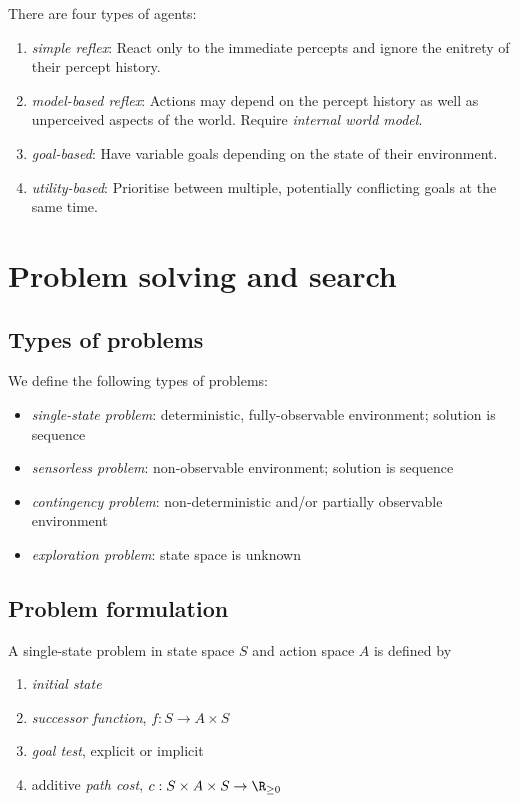 \documentclass{article}
\begin{document}
\begin{definition}[R\&N p. 47]
    There are four types of agents:
    \begin{enumerate}
        \item \emph{simple reflex}: React only to the immediate percepts and ignore
        the enitrety of their percept history.
        \item \emph{model-based reflex}: Actions may depend on the percept history
        as well as unperceived aspects of the world. Require \emph{internal world
        model}.
        \item \emph{goal-based}: Have variable goals depending on the state of their
        environment.
        \item \emph{utility-based}: Prioritise between multiple, potentially conflicting
        goals at the same time.
    \end{enumerate}
\end{definition}

\section{Problem solving and search}


\subsection{Types of problems}

\begin{definition}
    We define the following types of problems:
    \begin{itemize}
        \item \emph{single-state problem}: deterministic, fully-observable environment; solution is sequence
        \item \emph{sensorless problem}: non-observable environment; solution is sequence
        \item \emph{contingency problem}: non-deterministic and/or partially observable environment
        \item \emph{exploration problem}: state space is unknown
    \end{itemize}
\end{definition}

\subsection{Problem formulation}

\begin{definition}
    A single-state problem in state space $S$
    and action space $A$ is defined by
    \begin{enumerate}
        \item \emph{initial state}
        \item \emph{successor function}, $f:S\to A\times S$
        \item \emph{goal test}, explicit or implicit
        \item additive \emph{path cost}, $c:S\times A\times S\to\R_{\geq 0}$
    \end{enumerate}
\end{definition}
\end{document}

